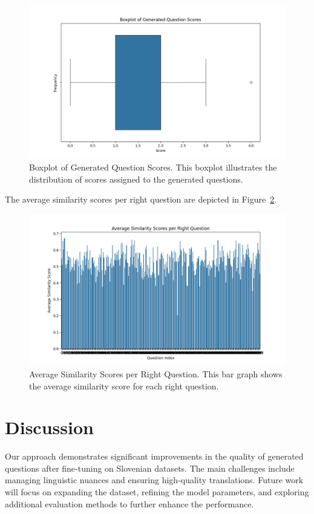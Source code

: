 \documentclass[fleqn,moreauthors,10pt]{ds_report}
\begin{document}
\begin{figure}[H]\centering
    \includegraphics[width=\linewidth]{gen_q_scores.png}
    \caption{Boxplot of Generated Question Scores. This boxplot illustrates the distribution of scores assigned to the generated questions.}
    \label{fig:boxplot_scores}
\end{figure}
The average similarity scores per right question are depicted in Figure~\ref{fig:average_similarity}.
\begin{figure}[H]\centering
    \includegraphics[width=\linewidth]{avg_sim_score1.png}
    \caption{Average Similarity Scores per Right Question. This bar graph shows the average similarity score for each right question.}
    \label{fig:average_similarity}
\end{figure}


\section*{Discussion}
Our approach demonstrates significant improvements in the quality of generated questions after fine-tuning on Slovenian datasets. The main challenges include managing linguistic nuances and ensuring high-quality translations. Future work will focus on expanding the dataset, refining the model parameters, and exploring additional evaluation methods to further enhance the performance.
\end{document}
